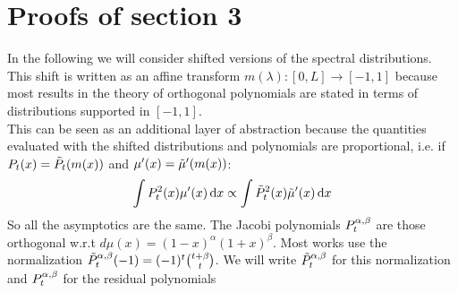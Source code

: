 \documentclass{article}
\begin{document}
\section{Proofs of section 3}
In the following we will consider shifted versions of the spectral distributions. This shift is written as an affine transform $m(\lambda):[0,L]\rightarrow [-1,1]$ because most results in the theory of orthogonal polynomials are stated in terms of distributions supported in $[-1,1]$. \\
This can be seen as an additional layer of abstraction because the quantities evaluated with the shifted distributions and polynomials are proportional, i.e. if $P_t(x)=\Tilde{P}_t(m(x))$ and $\mu'(x)=\Tilde{\mu}'(m(x))$:
\begin{equation}
    \int P_t^2(x)\mu'(x)\mathop{}\!\mathrm{d} x\propto \int \Tilde{P}_t^2(x)\Tilde{\mu}'(x)\mathop{}\!\mathrm{d} x
\end{equation}
So all the asymptotics are the same. The Jacobi polynomials $P^{\alpha,\beta}_t$ are those orthogonal w.r.t $d\mu(x)=(1-x)^\alpha(1+x)^\beta$. Most works use the  normalization $\Tilde{P}_t^{\alpha,\beta}(-1)=(-1)^t\binom{t+\beta}{t}$. We will write $\Tilde{P}^{\alpha,\beta}_t$ for this normalization and $P^{\alpha,\beta}_t$ for the residual polynomials
\robustjacobi*
\end{document}
